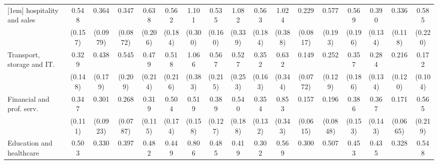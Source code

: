 {\begin{tabular}{l*{16}{c}}
[1em]
hospitality and sales&       0.548\sym{*}  &       0.364\sym{***}&       0.347\sym{***}&       0.638         &       0.562         &       1.101         &       0.535\sym{*}  &       1.082         &       0.563         &       1.024         &       0.229\sym{***}&       0.577         &       0.569         &       0.390\sym{**} &       0.336\sym{**} &       0.585         \\
                    &     (0.157)         &    (0.0979)         &    (0.0872)         &     (0.206)         &     (0.184)         &     (0.300)         &     (0.160)         &     (0.339)         &     (0.184)         &     (0.388)         &    (0.0817)         &     (0.193)         &     (0.196)         &     (0.134)         &     (0.118)         &     (0.220)         \\
[1em]
Transport, storage and IT.&       0.329\sym{*}  &       0.438\sym{*}  &       0.545         &       0.479         &       0.518         &       1.066         &       0.567         &       0.527         &       0.352\sym{*}  &       0.632         &       0.149\sym{***}&       0.252\sym{**} &       0.357\sym{*}  &       0.284\sym{**} &       0.216\sym{**} &       0.172\sym{**} \\
                    &     (0.148)         &     (0.179)         &     (0.209)         &     (0.214)         &     (0.216)         &     (0.383)         &     (0.215)         &     (0.253)         &     (0.163)         &     (0.344)         &    (0.0772)         &     (0.129)         &     (0.186)         &     (0.134)         &     (0.120)         &     (0.104)         \\
[1em]
Financial and prof. serv.&       0.347\sym{***}&       0.301\sym{***}&       0.268\sym{***}&       0.319\sym{**} &       0.504\sym{*}  &       0.519\sym{*}  &       0.389\sym{**} &       0.540         &       0.354\sym{**} &       0.853         &       0.157\sym{***}&       0.196\sym{***}&       0.386\sym{*}  &       0.367\sym{*}  &       0.171\sym{***}&       0.565         \\
                    &     (0.111)         &    (0.0923)         &    (0.0787)         &     (0.115)         &     (0.174)         &     (0.158)         &     (0.127)         &     (0.188)         &     (0.132)         &     (0.343)         &    (0.0615)         &    (0.0848)         &     (0.153)         &     (0.143)         &    (0.0665)         &     (0.219)         \\
[1em]
Education and healthcare&       0.503\sym{*}  &       0.330\sym{***}&       0.397\sym{***}&       0.482\sym{*}  &       0.449\sym{*}  &       0.806         &       0.485\sym{*}  &       0.419\sym{*}  &       0.302\sym{***}&       0.569         &       0.300\sym{***}&       0.507         &       0.453\sym{*}  &       0.435\sym{*}  &       0.328\sym{**} &       0.548         \\

\end{tabular}}
